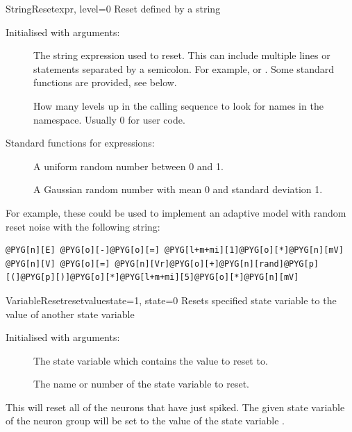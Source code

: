 \documentclass[letterpaper,10pt,english]{manual}
\begin{document}
\hypertarget{brian.StringReset}{}\begin{classdesc}{StringReset}{expr, level=0}
Reset defined by a string

Initialised with arguments:
\begin{description}
\item[] \leavevmode
The string expression used to reset. This can include 
multiple lines or statements separated by a semicolon.
For example,  or .
Some standard functions are provided, see below.

\item[] \leavevmode
How many levels up in the calling sequence to look for
names in the namespace. Usually 0 for user code.

\end{description}

Standard functions for expressions:
\begin{description}
\item[] \leavevmode
A uniform random number between 0 and 1.

\item[] \leavevmode
A Gaussian random number with mean 0 and standard deviation 1.

\end{description}

For example, these could be used to implement an adaptive
model with random reset noise with the following string:

\begin{Verbatim}[commandchars=@\[\]]
@PYG[n][E] @PYG[o][-]@PYG[o][=] @PYG[l+m+mi][1]@PYG[o][*]@PYG[n][mV]
@PYG[n][V] @PYG[o][=] @PYG[n][Vr]@PYG[o][+]@PYG[n][rand]@PYG[p][(]@PYG[p][)]@PYG[o][*]@PYG[l+m+mi][5]@PYG[o][*]@PYG[n][mV]
\end{Verbatim}
\end{classdesc}

\hypertarget{brian.VariableReset}{}\begin{classdesc}{VariableReset}{resetvaluestate=1, state=0}
Resets specified state variable to the value of another state variable

Initialised with arguments:
\begin{description}
\item[] \leavevmode
The state variable which contains the value to reset to.

\item[] \leavevmode
The name or number of the state variable to reset.

\end{description}

This will reset all of the neurons that have just spiked. The
given state variable of the neuron group will be set to
the value of the state variable .
\end{classdesc}
\end{document}
